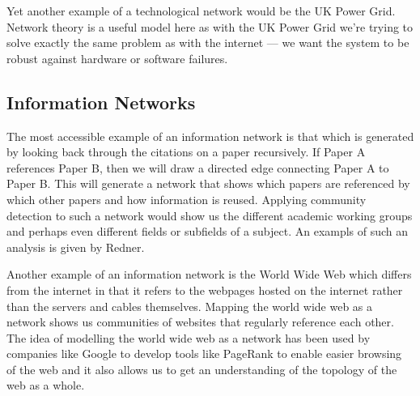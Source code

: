 Yet another example of a technological network would be the UK Power Grid. Network theory is a useful model here as with the UK Power Grid we're trying to solve exactly the same problem as with the internet --- we want the system to be robust against hardware or software failures.

\subsection{Information Networks}\label{sec:Information Networks}
The most accessible example of an information network is that which is generated by looking back through the citations on a paper recursively. If Paper A references Paper B, then we will draw a directed edge connecting Paper A to Paper B. This will generate a network that shows which papers are referenced by which other papers and how information is reused. Applying community detection to such a network would show us the different academic working groups and perhaps even different fields or subfields of a subject. An exampls of such an analysis is given by Redner.\cite{Redner1998}

Another example of an information network is the World Wide Web which differs from the internet in that it refers to the webpages hosted on the internet rather than the servers and cables themselves. Mapping the world wide web as a network shows us communities of websites that regularly reference each other. The idea of modelling the world wide web as a network has been used by companies like Google to develop tools like PageRank to enable easier browsing of the web\cite{pagerank} and it also allows us to get an understanding of the topology of the web as a whole.\cite{BARABASI200069}

